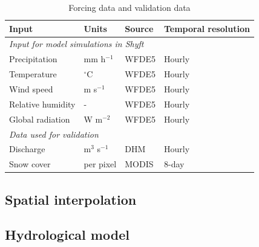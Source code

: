 \begin{table}[ht]
\centering
\caption{Forcing data and validation data}
\label{tab:forcing_validation}
\begin{tabular}{llll}
\toprule
\textbf{Input}    & \textbf{Units}   & \textbf{Source} & \textbf{Temporal resolution} \\
\hline
\multicolumn{4}{l}{\textit{Input for model simulations in Shyft}}                     \\
\hline
Precipitation     & mm h$^{-1}$      & WFDE5           & Hourly                       \\
Temperature       & $^{\circ}$C      & WFDE5           & Hourly                       \\
Wind speed        & m s$^{-1}$       & WFDE5           & Hourly                       \\
Relative humidity & -                & WFDE5           & Hourly                       \\
Global radiation  & W m$^{-2}$       & WFDE5           & Hourly                       \\
\hline
\multicolumn{4}{l}{\textit{Data used for validation}}                                 \\
\hline
Discharge         & m$^{3}$ s$^{-1}$ & DHM             & Hourly                       \\
Snow cover        & per pixel        & MODIS           & 8-day    \\
\bottomrule
\end{tabular}%
\end{table}


\subsection{Spatial interpolation}




\subsection{Hydrological model}





